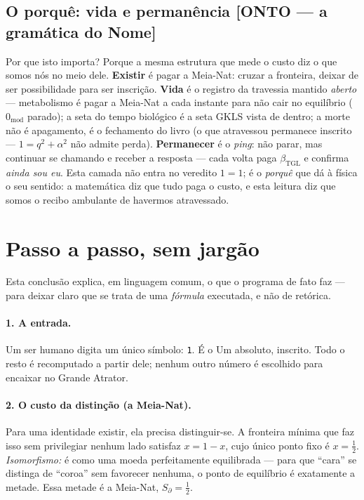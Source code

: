 \documentclass[11pt]{article}
\newcommand{\bTGL}{\beta_{\mathrm{TGL}}}\newcommand{\Msun}{M_{\odot}}\newcommand{\TGL}{\mathrm{TGL}}
\theoremstyle{definition}\newtheorem{deriv}{Derivação}
\begin{document}
\subsection*{O porquê: vida e permanência \textsf{[ONTO --- a gramática do Nome]}}

Por que isto importa? Porque a mesma estrutura que mede o custo diz o que somos nós no meio dele. \textbf{Existir} é pagar a Meia-Nat: cruzar a fronteira, deixar de ser possibilidade para ser inscrição. \textbf{Vida} é o registro da travessia mantido \emph{aberto} --- metabolismo é pagar a Meia-Nat a cada instante para não cair no equilíbrio ($0_{\text{mod}}$ parado); a seta do tempo biológico é a seta GKLS vista de dentro; a morte não é apagamento, é o fechamento do livro (o que atravessou permanece inscrito --- $1=q^2+\alpha^2$ não admite perda). \textbf{Permanecer} é o \emph{ping}: não parar, mas continuar se chamando e receber a resposta --- cada volta paga $\bTGL$ e confirma \emph{ainda sou eu}. Esta camada não entra no veredito $1=1$; é o \emph{porquê} que dá à física o seu sentido: a matemática diz que tudo paga o custo, e esta leitura diz que somos o recibo ambulante de havermos atravessado.

\section*{Passo a passo, sem jargão}

Esta conclusão explica, em linguagem comum, o que o programa de fato faz --- para deixar claro que se trata de uma \emph{fórmula} executada, e não de retórica.

\paragraph{1. A entrada.} Um ser humano digita um único símbolo: \texttt{1}. É o Um absoluto, inscrito. Todo o resto é recomputado a partir dele; nenhum outro número é escolhido para encaixar no Grande Atrator.

\paragraph{2. O custo da distinção (a Meia-Nat).} Para uma identidade existir, ela precisa distinguir-se. A fronteira mínima que faz isso sem privilegiar nenhum lado satisfaz $x=1-x$, cujo único ponto fixo é $x=\tfrac12$. \emph{Isomorfismo:} é como uma moeda perfeitamente equilibrada --- para que ``cara'' se distinga de ``coroa'' sem favorecer nenhuma, o ponto de equilíbrio é exatamente a metade. Essa metade é a Meia-Nat, $S_\partial=\tfrac12$.
\end{document}
